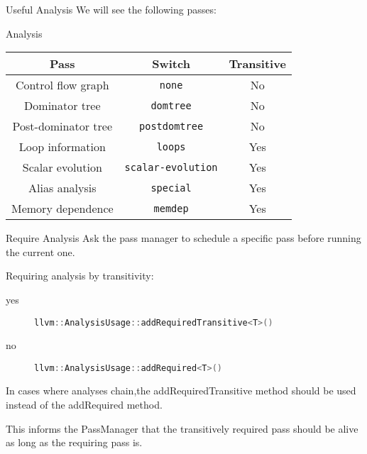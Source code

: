 \documentclass[10pt,mathserif]{beamer}
\newcommand{\cppinline}[1]{\lstinline[language=C++]!#1!}
\begin{document}
\begin{frame}{Useful Analysis}
We will see the following passes:

\begin{block}{Analysis}
\centering
\begin{tabular}{ccc}
\toprule

\multicolumn{1}{c}{\textbf{Pass}}        &
\multicolumn{1}{c}{\textbf{Switch}}      &
\multicolumn{1}{c}{\textbf{Transitive}} \\

\midrule

Control flow graph  &
\texttt{none}       &
No                 \\

Dominator tree    &
\texttt{domtree}  &
No               \\

Post-dominator tree   &
\texttt{postdomtree}  &
No                   \\

Loop information  &
\texttt{loops}    &
Yes              \\

Scalar evolution           &
\texttt{scalar-evolution}  &
Yes                       \\

Alias analysis    &
\texttt{special}  &
Yes              \\

Memory dependence  &
\texttt{memdep}    &
Yes               \\

\bottomrule
\end{tabular}
\end{block}
\end{frame}

\begin{frame}{Require Analysis}
Ask the pass manager to schedule a specific pass
before running the current one.

\vfill
Requiring analysis by transitivity:
\begin{description}
\item[yes] \cppinline{llvm::AnalysisUsage::addRequiredTransitive<T>()}
\item[no] \cppinline{llvm::AnalysisUsage::addRequired<T>()}
\end{description}

\vfill
In cases where \alert{analyses chain},the addRequiredTransitive method
should be used instead of the addRequired method.

This informs the PassManager that the transitively required pass
should be alive as long as the requiring pass is.
\end{frame}
\end{document}
